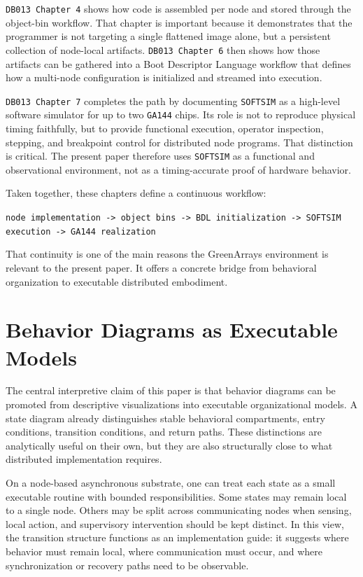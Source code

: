 \documentclass[11pt]{article}
\begin{document}
\texttt{DB013 Chapter 4} shows how code is assembled per node and
stored through the object-bin workflow. That chapter is important
because it demonstrates that the programmer is not targeting a single
flattened image alone, but a persistent collection of node-local
artifacts. \texttt{DB013 Chapter 6} then shows how those artifacts can
be gathered into a Boot Descriptor Language workflow that defines how a
multi-node configuration is initialized and streamed into execution.

\texttt{DB013 Chapter 7} completes the path by documenting
\texttt{SOFTSIM} as a high-level software simulator for up to two
\texttt{GA144} chips. Its role is not to reproduce physical timing
faithfully, but to provide functional execution, operator inspection,
stepping, and breakpoint control for distributed node programs. That
distinction is critical. The present paper therefore uses
\texttt{SOFTSIM} as a functional and observational environment, not as
a timing-accurate proof of hardware behavior.

Taken together, these chapters define a continuous workflow:

\begin{center}
\texttt{node implementation -> object bins -> BDL initialization -> SOFTSIM execution -> GA144 realization}
\end{center}

That continuity is one of the main reasons the GreenArrays environment
is relevant to the present paper. It offers a concrete bridge from
behavioral organization to executable distributed embodiment.

\section*{Behavior Diagrams as Executable Models}

The central interpretive claim of this paper is that behavior diagrams
can be promoted from descriptive visualizations into executable
organizational models. A state diagram already distinguishes stable
behavioral compartments, entry conditions, transition conditions, and
return paths. These distinctions are analytically useful on their own,
but they are also structurally close to what distributed implementation
requires.

On a node-based asynchronous substrate, one can treat each state as a
small executable routine with bounded responsibilities. Some states may
remain local to a single node. Others may be split across
communicating nodes when sensing, local action, and supervisory
intervention should be kept distinct. In this view, the transition
structure functions as an implementation guide: it suggests where
behavior must remain local, where communication must occur, and where
synchronization or recovery paths need to be observable.
\end{document}
